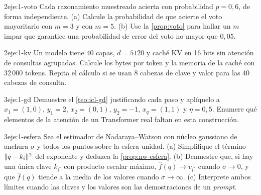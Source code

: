 \begin{ejercicio}{2}{eje:1-voto}
Cada razonamiento muestreado acierta con probabilidad $p=0{,}6$, de forma independiente. (a) Calcule la probabilidad de que acierte el voto mayoritario con $m=3$ y con $m=5$. (b) Use la \cref{prop:voto} para hallar un $m$ impar que garantice una probabilidad de error del voto no mayor que $0{,}05$.
\end{ejercicio}

\begin{ejercicio}{2}{eje:1-kv}
Un modelo tiene 40 capas, $d=5120$ y caché KV en 16 bits sin atención de consultas agrupadas. Calcule los bytes por token y la memoria de la caché con 32\,000 tokens. Repita el cálculo si se usan 8 cabezas de clave y valor para las 40 cabezas de consulta.
\end{ejercicio}

\begin{ejercicio}{3}{eje:1-gd}
Demuestre el \cref{teo:icl-gd} justificando cada paso y aplíquelo a $x_1=(1,0)$, $y_1=2$, $x_2=(0,1)$, $y_2=-1$, $x_q=(1,1)$ y $\eta=0{,}5$. Enumere qué elementos de la atención de un Transformer real faltan en esta construcción.
\end{ejercicio}

\begin{ejercicio}{3}{eje:1-esfera}
Sea el estimador de Nadaraya--Watson con núcleo gaussiano de anchura $\sigma$ y todos los puntos sobre la esfera unidad. (a) Simplifique el término $\lVert q-k_i\rVert^{2}$ del exponente y deduzca la \cref{prop:nw-esfera}. (b) Demuestre que, si hay una única clave $k_{i^\ast}$ con producto escalar máximo, $\hat f(q)\to v_{i^\ast}$ cuando $\sigma\to 0$, y que $\hat f(q)$ tiende a la media de los valores cuando $\sigma\to\infty$. (c) Interprete ambos límites cuando las claves y los valores son las demostraciones de un \emph{prompt}.
\end{ejercicio}
